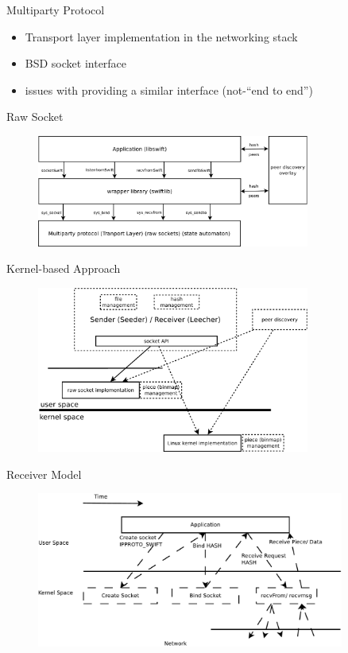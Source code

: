 \documentclass{beamer}
\begin{document}
\begin{frame}{Multiparty Protocol}
  \begin{itemize}
    \item Transport layer implementation in the networking stack
    \item BSD socket interface
    \item issues with providing a similar interface (not-``end to end'')
  \end{itemize}
\end{frame}

\begin{frame}{Raw Socket}
  \begin{figure}
    \includegraphics[width=0.8\textwidth]{img/architecture-overview}
  \end{figure}
\end{frame}

\begin{frame}{Kernel-based Approach}
  \begin{figure}
    \includegraphics[width=0.8\textwidth]{img/detailed-architecture}
  \end{figure}
\end{frame}

\begin{frame}{Receiver Model}
  \begin{figure}
    \includegraphics[width=0.9\textwidth]{img/multiparty-recvmsg}
  \end{figure}
\end{frame}
\end{document}
